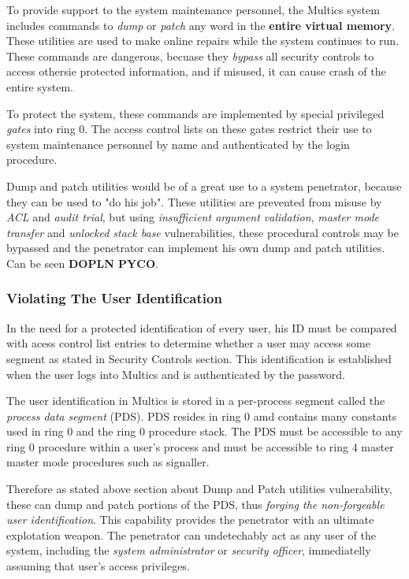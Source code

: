 To provide support to the system maintenance personnel, the Multics system includes commands to \textit{dump} or 
\textit{patch} any word in the \textbf{entire virtual memory}. These utilities are used to make online repairs while 
the system continues to run. These commands are dangerous, becuase they \textit{bypass} all security controls to 
access othersie protected information, and if misused, it can cause crash of the entire system.

To protect the system, these commands are implemented by special privileged \textit{gates} into ring 0. The access control 
lists on these gates restrict their use to system maintenance personnel by name and authenticated by the login procedure.

Dump and patch utilities would be of a great use to a system penetrator, because they can be used to "do his job". These 
utilities are prevented from misuse by \textit{ACL} and \textit{audit trial}, but using  \textit{insufficient argument
validation}, \textit{master mode transfer} and \textit{unlocked stack base} vulnerabilities, these procedural controls 
may be bypassed and the penetrator can implement his own dump and patch utilities. Can be seen \textbf{DOPLN PYCO}.

\subsubsection{Violating The User Identification}

In the need for a protected identification of every user, his ID must be compared with acess control list entries 
to determine whether a user may access some segment as stated in Security Controls section.
This identification is established when the user logs into Multics and is authenticated by the password.

The user identification in Multics is stored in a per-process segment called the \textit{process data segment} (PDS).
PDS resides in ring 0 amd contains many constants used in ring 0 and the ring 0 procedure stack. The PDS must be 
accessible to any ring 0 procedure within a user's process and must be accessible to ring 4 master master mode 
procedures such as signaller.

Therefore as stated above section about Dump and Patch utilities vulnerability, these can dump and patch portions of the 
PDS, thus \textit{forging the non-forgeable user identification}.
This capability provides the penetrator with an ultimate explotation weapon. The penetrator can undetechably act as any 
user of the system, including the \textit{system administrator} or \textit{security officer}, immediatelly assuming that 
user's access privileges.

